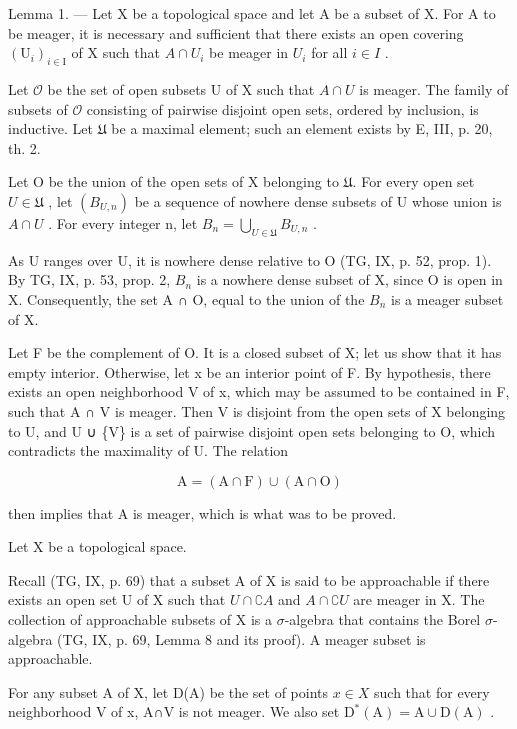Lemma 1. --- Let X be a topological space and let A be a subset of X. For A to be meager, it is necessary and sufficient that there exists an open covering \((\mathrm{U}_{i})_{i\in\mathrm{I}}\) of X such that \(A\cap U_{i}\) be meager in \(U_{i}\) for all \(i\in I\) .

Let \(\mathcal{O}\) be the set of open subsets U of X such that \(A \cap U\) is meager. The family of subsets of \(\mathcal{O}\) consisting of pairwise disjoint open sets, ordered by inclusion, is inductive. Let \(\mathfrak{U}\) be a maximal element; such an element exists by E, III, p. 20, th. 2.

Let O be the union of the open sets of X belonging to \(\mathfrak{U}\). For every open set \(U \in \mathfrak{U}\) , let \((B_{U,n})\) be a sequence of nowhere dense subsets of U whose union is \(A \cap U\) . For every integer n, let \(B_n = \bigcup_{U \in \mathfrak{U}} B_{U,n}\) .

As U ranges over U, it is nowhere dense relative to O (TG, IX, p. 52, prop. 1). By TG, IX, p. 53, prop. 2, \(B_{n}\) is a nowhere dense subset of X, since O is open in X. Consequently, the set A ∩ O, equal to the union of the \(B_{n}\) is a meager subset of X.

Let F be the complement of O. It is a closed subset of X; let us show that it has empty interior. Otherwise, let x be an interior point of F. By hypothesis, there exists an open neighborhood V of x, which may be assumed to be contained in F, such that A ∩ V is meager. Then V is disjoint from the open sets of X belonging to U, and U ∪ \{V\} is a set of pairwise disjoint open sets belonging to O, which contradicts the maximality of U. The relation

\[
\mathrm{A} = (\mathrm{A} \cap \mathrm{F}) \cup (\mathrm{A} \cap \mathrm{O})
\]

then implies that A is meager, which is what was to be proved.

Let X be a topological space.

Recall (TG, IX, p. 69) that a subset A of X is said to be approachable if there exists an open set U of X such that \(U \cap \complement A\) and \(A \cap \complement U\) are meager in X. The collection of approachable subsets of X is a \(\sigma\)-algebra that contains the Borel \(\sigma\)-algebra (TG, IX, p. 69, Lemma 8 and its proof). A meager subset is approachable.

For any subset A of X, let D(A) be the set of points \(x \in X\) such that for every neighborhood V of x, A∩V is not meager. We also set \(\mathrm{D}^{*}(\mathrm{A}) = \mathrm{A} \cup \mathrm{D}(\mathrm{A})\) .

